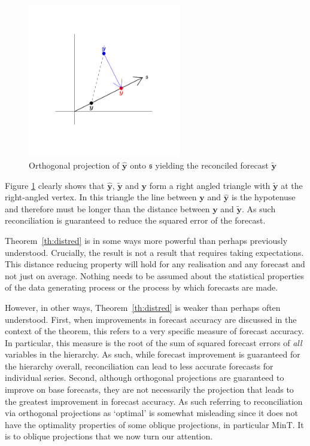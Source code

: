\documentclass[12pt]{article}
\theoremstyle{definition}
\begin{document}
	\begin{figure}[H]
		\centering \includegraphics[width=0.6\textwidth]{Figs/orth_pointforerec_schematic.pdf}
		\caption{Orthogonal projection of $\hat{\bm{y}}$ onto $\mathfrak{s}$ yielding the reconciled forecast $\tilde{\bm{y}}$}\label{fig:Schematic_OLSRecon}
	\end{figure}
		
	Figure \ref{fig:Schematic_OLSRecon} clearly shows that $\hat{\bm{y}}$, $\tilde{\bm{y}}$ and $\bm{y}$ form a right angled triangle with $\tilde{\bm{y}}$ at the right-angled vertex.  In this triangle the line between $\bm{y}$ and $\hat{\bm{y}}$ is the hypotenuse and therefore must be longer than the distance between $\bm{y}$ and $\tilde{\bm{y}}$.  As such reconciliation is guaranteed to reduce the squared error of the forecast.
	
    Theorem~\ref{th:distred} is in some ways more powerful than perhaps previously understood.  Crucially, the result is not a result that requires taking expectations.  This distance reducing property will hold for any realisation and any forecast and not just on average.  Nothing needs to be assumed about the statistical properties of the data generating process or the process by which forecasts are made.

    However, in other ways, Theorem~\ref{th:distred} is weaker than perhaps often understood. First, when improvements in forecast accuracy are discussed in the context of the theorem, this refers to a very specific measure of forecast accuracy.  In particular, this measure is the root of the sum of squared forecast errors of {\em all} variables in the hierarchy.  As such, while forecast improvement is guaranteed for the hierarchy overall, reconciliation can lead to less accurate forecasts for individual series. Second, although orthogonal projections are guaranteed to improve on base forecasts, they are not necessarily the projection that leads to the greatest improvement in forecast accuracy.  As such referring to reconciliation via orthogonal projections as `optimal' is somewhat misleading since it does not have the optimality properties of some oblique projections, in particular MinT. It is to oblique projections that we now turn our attention.
    	
\end{document}
